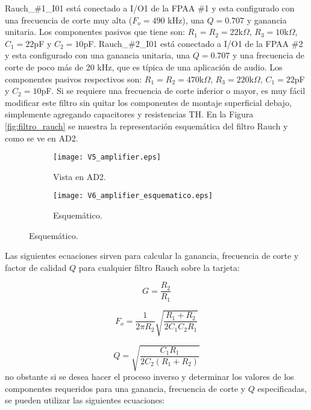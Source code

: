 	Rauch\_\#1\_I01 está conectado a I/O1 de la FPAA \#1 y esta configurado con una frecuencia de corte muy alta ($F_{o} = 490$ kHz), una $Q = 0.707$ y ganancia unitaria. Los componentes pasivos que tiene son: $R_{1} = R_{2} = 22$k$\Omega$, $R_{3} = 10$k$\Omega$, $C_{1} = 22$pF y $C_{2} = 10$pF.  Rauch\_\#2\_I01 está conectado a I/O1 de la FPAA \#2 y esta configurado con una ganancia unitaria, una $Q = 0.707$ y una frecuencia de corte de poco más de 20 kHz, que es típica de una aplicación de audio. Los componentes pasivos respectivos son: $R_{1} = R_{2} = 470$k$\Omega$, $R_{3} = 220$k$\Omega$, $C_{1} = 22$pF y $C_{2} = 10$pF. Si se requiere una frecuencia de corte inferior o mayor, es muy fácil modificar este filtro sin quitar los componentes de montaje superficial debajo, simplemente agregando capacitores y resistencias TH. En la Figura \ref{fig:filtro_rauch} se muestra la representación esquemática del filtro Rauch y como se ve en AD2.
	
	\begin{figure}[!ht]
	\centering   
	\caption{Diferentes representaciones de filtro Rauch.}
	\label{fig:filtro_rauch}
		\begin{subfigure}{0.3\textwidth}
			\centering   
			\texttt{[image: V5\_amplifier.eps]}
			\caption{Vista en AD2.}
			\label{fig:V5_amplifier}
		\end{subfigure}
		\begin{subfigure}{0.65\textwidth}
			\centering   
			\texttt{[image: V6\_amplifier\_esquematico.eps]}
			\caption{Esquemático.}
			\label{fig:V6_amplifier_esquematico}
		\end{subfigure}
	\end{figure}

	Las siguientes ecuaciones sirven para calcular la ganancia, frecuencia de corte y factor de calidad $Q$ para cualquier filtro Rauch sobre la tarjeta:
	
	\begin{equation}
		G = \frac{R_{2}}{R_{1}}
	\end{equation}
	
	\begin{equation}
		F_{o} = \frac{1}{2 \pi R_{2}} \sqrt{ \frac{R_{1}+ R_{2} }{2 C_{1} C_{2} R_{1}}}
	\end{equation}
	
	\begin{equation}
		Q = \sqrt{\frac{C_{1} R_{1}}{2 C_{2} (R_{1} + R_{2})}}
	\end{equation}
	no obstante si se desea hacer el proceso inverso y determinar los valores de los componentes requeridos para una ganancia, frecuencia de corte y $Q$ especificadas, se pueden utilizar las siguientes ecuaciones: 
	

